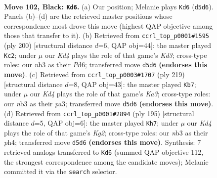 \documentclass[11pt]{article}
\begin{document}
\clearpage

\begin{figure}[p]\centering
\begin{subfigure}{0.46\textwidth}\centering
\resizebox{\linewidth}{!}{%
\newchessgame
\chessboard[
  setfen={8/8/8/3k2K1/8/1N6/2R3Pr/8 b - - 69 102},
  showmover=false,
  pgfstyle=straightmove, color=movearrow, markmove={d5-d6}
]}
\caption{}
\end{subfigure}\hfill
\begin{subfigure}{0.46\textwidth}\centering
\resizebox{\linewidth}{!}{%
\newchessgame
\chessboard[
  setfen={8/8/r2P4/8/5k2/3K4/p7/R7 w - - 7 101},
  showmover=false,
  pgfstyle=straightmove, color=movearrow, markmove={d3-c2}
]}
\caption{}
\end{subfigure}
\\[4pt]
\begin{subfigure}{0.46\textwidth}\centering
\resizebox{\linewidth}{!}{%
\newchessgame
\chessboard[
  setfen={7R/8/k7/8/7P/P6r/1K6/8 b - - 4 110},
  showmover=false,
  pgfstyle=straightmove, color=movearrow, markmove={a6-b7}
]}
\caption{}
\end{subfigure}\hfill
\begin{subfigure}{0.46\textwidth}\centering
\resizebox{\linewidth}{!}{%
\newchessgame
\chessboard[
  setfen={1R6/1P4k1/8/2K5/7P/8/1r6/8 b - - 8 98},
  showmover=false,
  pgfstyle=straightmove, color=movearrow, markmove={g7-h7}
]}
\caption{}
\end{subfigure}
\caption{\textbf{Move 102, Black: \texttt{Kd6}.} (a) Our position; Melanie plays \texttt{Kd6} (\texttt{d5d6}). Panels (b)--(d) are the retrieved master positions whose correspondence most drove this move (highest QAP objective among those that transfer to it). (b) Retrieved from \texttt{ccrl\_top\_p0001\#1595} (ply 200) [structural distance $d$=6, QAP obj=44]: the master played \texttt{Kc2}; under $\mu$ our \emph{Kd4} plays the role of that game's \emph{Kd3}; cross-type roles: our \emph{n}b3 as their \emph{P}d6; transferred move \texttt{d5d6} \textbf{(endorses this move)}. (c) Retrieved from \texttt{ccrl\_top\_p0003\#1707} (ply 219) [structural distance $d$=8, QAP obj=43]: the master played \texttt{Kb7}; under $\mu$ our \emph{Kd4} plays the role of that game's \emph{Ka3}; cross-type roles: our \emph{n}b3 as their \emph{p}a3; transferred move \texttt{d5d6} \textbf{(endorses this move)}. (d) Retrieved from \texttt{ccrl\_top\_p0001\#2894} (ply 195) [structural distance $d$=5, QAP obj=6]: the master played \texttt{Kh7}; under $\mu$ our \emph{Kd4} plays the role of that game's \emph{Kg2}; cross-type roles: our \emph{n}b3 as their \emph{p}h4; transferred move \texttt{d5d6} \textbf{(endorses this move)}. Synthesis: 7 retrieved analogs transferred to \texttt{Kd6} (summed QAP objective 112, the strongest correspondence among the candidate moves); Melanie committed it via the \texttt{search} selector.}
\label{fig:thought-m203}
\end{figure}
\end{document}
